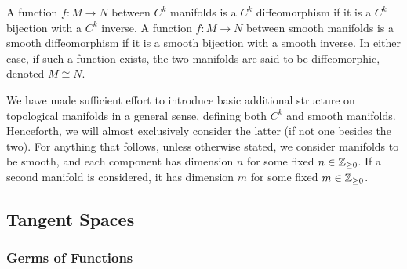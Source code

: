 \documentclass[a4paper,12pt]{article}
\begin{document}
\begin{definition}[Diffeomorphism]\label{def:diffeomorphism}
    A function $f \colon M \to N$ between $C^k$ manifolds is a $C^k$ diffeomorphism if it is a $C^k$ bijection with a $C^k$ inverse.
    A function $f \colon M \to N$ between smooth manifolds is a smooth diffeomorphism if it is a smooth bijection with a smooth inverse.
    In either case, if such a function exists, the two manifolds are said to be diffeomorphic, denoted $M \cong N$.
\end{definition}
We have made sufficient effort to introduce basic additional structure on topological manifolds in a general sense, defining both $C^k$ and smooth manifolds.
Henceforth, we will almost exclusively consider the latter (if not one besides the two).
For anything that follows, unless otherwise stated, we consider manifolds to be smooth, and each component has dimension $n$ for some fixed $n \in \mathbb{Z}_{\geq 0}$.
If a second manifold is considered, it has dimension $m$ for some fixed $m \in \mathbb{Z}_{\geq 0}$.

\subsection{Tangent Spaces}\label{subsec:manifolds:tangent_spaces}

\subsubsection{Germs of Functions}\label{subsubsec:manifolds:tangent_spaces:germs_of_functions}
\end{document}
